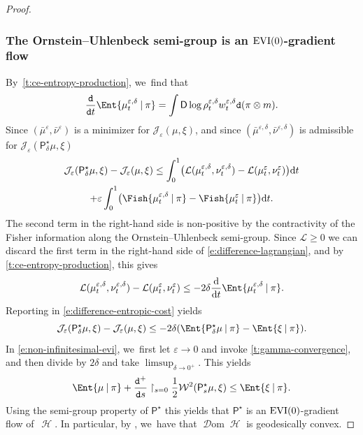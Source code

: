 \documentclass[JEP,XML,SOM,Unicode,published]{cedram}
\newcommand{\EVI}{\textup{EVI}}
\theoremstyle{definition}
\theoremstyle{remark}
\DeclarePairedDelimiter{\paren}{\lparen}{\rparen}
\newcommand{\given}[1][]{%
\nonscript\:#1\vert
\allowbreak
\nonscript\:
\mathopen{}}
\DeclareMathOperator{\ent}{\mathcal{H}}
\DeclareMathOperator{\dom}{\mathscr{D}om}
\begin{document}
\begin{proof}
\subsubsection*{The Ornstein--Uhlenbeck semi-group is an $\EVI(0)$-gradient flow}
By~\cref{t:ce-entropy-production}, we~find that
\begin{equation}\label{e:entropy-production-epsilon}
\frac{\mathtt{d}}{\mathtt{d} t} \Ent{ \mu_{t}^{\varepsilon,\delta} \given \pi } = \int \mathsf{D} \log \rho^{\varepsilon,\delta}_{t} w^{\varepsilon,\delta}_{t} \mathtt{d} (\pi \otimes m).
\end{equation}
Since $(\bar{\mu}^{\varepsilon}, \bar{\nu}^{\varepsilon})$ is a minimizer for $\mathcal{J}_{\varepsilon}(\mu, \xi)$, and since $(\bar{\mu}^{\varepsilon,\delta}, \bar{\nu}^{\varepsilon,\delta})$ is admissible for $\mathcal{J}_{\varepsilon}(\mathsf{P}^{\star}_{\delta}\mu, \xi)$
\begin{multline}\label{e:difference-entropic-cost}
\mathcal{J}_{\varepsilon}(\mathsf{P}^{\star}_{\delta}\mu, \xi) - \mathcal{J}_{\varepsilon}(\mu, \xi) \leq \int_{0}^{1} \paren[\big]{\mathcal{L}(\mu^{\varepsilon,\delta}_{t}, \nu^{\varepsilon,\delta}_{t}) - \mathcal{L}(\mu^{\varepsilon}_{t}, \nu^{\varepsilon}_{t})} \mathrm{d} t\\
+ \varepsilon \int_{0}^{1} \paren[\big]{ \Fish{ \mu^{\varepsilon,\delta}_{t} \given \pi } - \Fish{ \mu^{\varepsilon}_{t} \given \pi } } \mathrm{d} t.
\end{multline}
The second term in the right-hand side is non-positive by the contractivity of the Fisher information along the Ornstein--Uhlenbeck semi-group.
Since $\mathcal{L} \geq 0$ we can discard the first term in the right-hand side of \cref{e:difference-lagrangian}, and by \cref{t:ce-entropy-production}, this gives
\begin{equation*}
\mathcal{L}(\mu^{\varepsilon,\delta}_{t}, \nu^{\varepsilon,\delta}_{t}) - \mathcal{L}(\mu^{\varepsilon}_{t}, \nu^{\varepsilon}_{t}) \leq -2 \delta \frac{\mathrm{d}}{\mathrm{d} t} \Ent{ \mu^{\varepsilon,\delta}_{t} \given \pi }.
\end{equation*}
Reporting in \cref{e:difference-entropic-cost} yields
\begin{equation}\label{e:non-infinitesimal-evi}
\mathcal{J}_{\varepsilon}(\mathsf{P}^{\star}_{\delta}\mu, \xi) - \mathcal{J}_{\varepsilon}(\mu, \xi) \leq - 2 \delta \paren*{ \Ent{ \mathsf{P}^{\star}_{\delta} \mu \given \pi } - \Ent{ \xi \given \pi } }.
\end{equation}
In \cref{e:non-infinitesimal-evi}, we~first let $\varepsilon \to 0$ and invoke \cref{t:gamma-convergence}, and then divide by $2 \delta$ and take $\limsup_{\delta \to 0^{+}}$.
This yields
\begin{equation*}
\Ent{ \mu \given \pi } + \frac{\mathtt{d}^{+}}{\mathtt{d} s} \restriction_{s=0} \frac{1}{2} \mathcal{W}^{2}(\mathsf{P}^{\star}_{s}\mu, \xi) \leq \Ent{ \xi \given \pi }.
\end{equation*}
Using the semi-group property of $\mathsf{P}^{\star}$ this yields that $\mathsf{P}^{\star}$ is an $\EVI(0)$-gradient flow of~$\ent$.
In particular, by \cite[Th.\,2.1]{DaneriSavare}, we~have that $\dom \ent$ is geodesically convex.


\end{proof}
\end{document}

